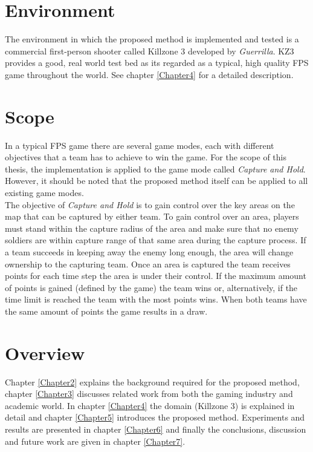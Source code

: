 \section{Environment}
The environment in which the proposed method is implemented and tested is a
commercial first-person shooter called Killzone 3 developed by
\emph{Guerrilla}. KZ3 provides a good, real world test bed as its regarded as a
typical, high quality FPS game throughout the world. See chapter
\ref{Chapter4} for a detailed description.

\section{Scope}
In a typical FPS game there are several game modes, each with different
objectives that a team has to achieve to win the game. For the scope of this
thesis, the implementation is applied to the game mode called \emph{Capture and
Hold}.  However, it should be noted that the proposed method itself can be
applied to all existing game modes.\\
The objective of \emph{Capture and Hold} is to gain control over the key areas
on the map that can be captured by either team. To gain control over an area,
players must stand within the capture radius of the area and make sure that no
enemy soldiers are within capture range of that same area during the capture
process. If a team succeeds in keeping away the enemy long enough, the area
will change ownership to the capturing team. Once an area is captured the team
receives points for each time step the area is under their control. If the
maximum amount of points is gained (defined by the game) the team wins or,
alternatively, if the time limit is reached the team with the most points wins.
When both teams have the same amount of points the game results in a draw.

\section{Overview}
Chapter \ref{Chapter2} explains the background required for the proposed
method, chapter \ref{Chapter3} discusses related work from both the gaming
industry and academic world. In chapter \ref{Chapter4} the domain (Killzone 3)
is explained in detail and chapter \ref{Chapter5} introduces the proposed
method.  Experiments and results are presented in chapter \ref{Chapter6} and
finally the conclusions, discussion and future work are given in chapter
\ref{Chapter7}.
